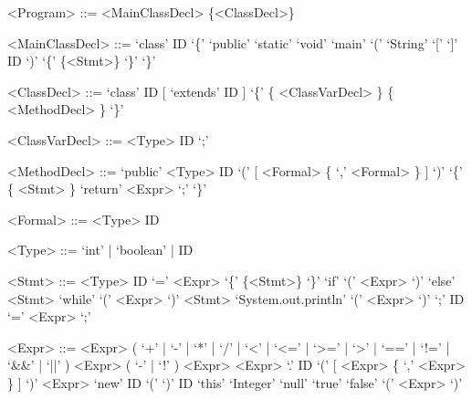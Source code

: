 \documentclass{report}
\begin{document}
\setlength{\grammarparsep}{12pt} %
\setlength{\grammarindent}{12em} %

\begin{grammar}

<Program> ::= <MainClassDecl> \{<ClassDecl>\}

<MainClassDecl> ::= `class' ID `\{' `public' `static' `void' `main' `(' `String' `[' `]' ID `)' `\{' \{<Stmt>\} `\}' `\}'

<ClassDecl> ::= `class' ID [ `extends' ID ] `\{' \{ <ClassVarDecl> \} \{ <MethodDecl> \} `\}'

<ClassVarDecl> ::= <Type> ID `;'

<MethodDecl> ::= `public' <Type> ID `(' [ <Formal> \{ `,' <Formal> \} ] `)' `\{' \{ <Stmt> \} `return' <Expr> `;' `\}'

<Formal> ::= <Type> ID

<Type> ::= `int' | `boolean' | ID

<Stmt> ::= <Type> ID `=' <Expr>
\alt `\{' \{<Stmt>\} `\}'
\alt `if' `(' <Expr> `)' `else' <Stmt>
\alt `while' `(' <Expr> `)' <Stmt>
\alt `System.out.println' `(' <Expr> `)' `;'
\alt ID `=' <Expr> `;'

<Expr> ::= <Expr> ( `+' | `-' | `*' | `/' | `<' | `<=' | `>=' | `>' | `==' | `!=' | `&&' | `||' ) <Expr> 
\alt ( `-' | `!' ) <Expr>
\alt <Expr> `.' ID `(' [ <Expr> \{ `,' <Expr> \} ] `)'
\alt <Expr> `new' ID `(' `)'
\alt ID
\alt `this'
\alt `Integer'
\alt `null'
\alt `true'
\alt `false'
\alt `(' <Expr> `)'

\end{grammar}
\end{document}
